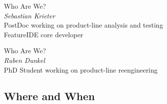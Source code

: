 \begin{frame}{\myframetitle}
	\begin{fancycolumns}[animation=none]
			\begin{note}{Who Are We?}
			    \centering
			    \\[.5ex]
				\emph{Sebastian Krieter}\\[.5ex]
				\small PostDoc working on product-line analysis and testing\\[.5ex]
				FeatureIDE core developer
			\end{note}
				\nextcolumn
		\begin{note}{Who Are We?}
			\centering
			\\[.5ex]
			\emph{Ruben Dunkel}\\[.5ex]
			\small PhD Student working on product-line reengineering\\[.5ex]
			\phantom {Fp}
		\end{note}
	\end{fancycolumns}
\end{frame}

\subsection{Where and When}

